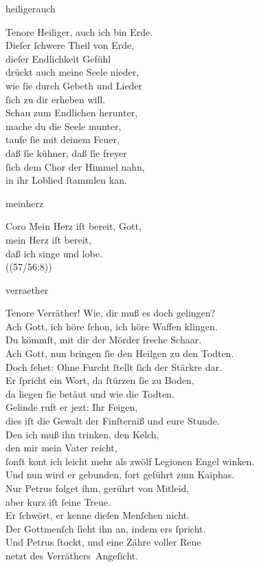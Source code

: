 \documentclass[shorttitlesize=55,tocstyle=ref-genre]{ees}
\begin{document}
{\begin{movement}{heiligerauch}
  \item[Tenore]
  Heiliger, auch ich bin Erde.\\
  Dieſer ſchwere Theil von Erde,\\
  dieſer Endlichkeit Gefühl\\
  drückt auch meine Seele nieder,\\
  wie ſie durch Gebeth und Lieder\\
  ſich zu dir erheben will.\\
  Schau zum Endlichen herunter,\\
  mache du die Seele munter,\\
  taufe ſie mit deinem Feuer,\\
  daß ſie kühner, daß ſie freyer\\
  ſich dem Chor der Himmel nahn,\\
  in ihr Loblied ſtammlen kan.
\end{movement}

\begin{movement}{meinherz}
  \item[Coro]
  Mein Herz iſt bereit, Gott,\\
  mein Herz iſt bereit,\\
  daß ich singe und lobe.\\
  ((57/56:8))
\end{movement}

\begin{movement}{verraether}
  \item[Tenore]
  Verräther! Wie, dir muß es doch gelingen?\\
  Ach Gott, ich höre ſchon, ich höre Waffen klingen.\\
  Du kömmſt, mit dir der Mörder freche Schaar.\\
  Ach Gott, nun bringen ſie den Heilgen zu den Todten.\\
  Doch ſehet: Ohne Furcht ſtellt ſich der Stärkre dar.\\
  Er ſpricht ein Wort, da ſtürzen ſie zu Boden,\\
  da liegen ſie betäut und wie die Todten.\\
  Gelinde ruft er jezt: Ihr Feigen,\\
  dies iſt die Gewalt der Finſterniß und eure Stunde.\\
  Den ich muß ihn trinken, den Kelch,\\
  den mir mein Vater reicht,\\
  ſonſt kont ich leicht mehr als zwölf Legionen Engel winken.\\
  Und nun wird er gebunden, fort geführt zum Kaiphas.\\
  Nur Petrus folget ihm, gerührt von Mitleid,\\
  aber kurz iſt ſeine Treue.\\
  Er ſchwört, er kenne dieſen Menſchen nicht.\\
  Der Gottmenſch ſieht ihn an, indem ers ſpricht.\\
  Und Petrus ſtockt, und eine Zähre voller Reue\\
  netzt des Verräthers Angeſicht.
\end{movement}

}
\end{document}
